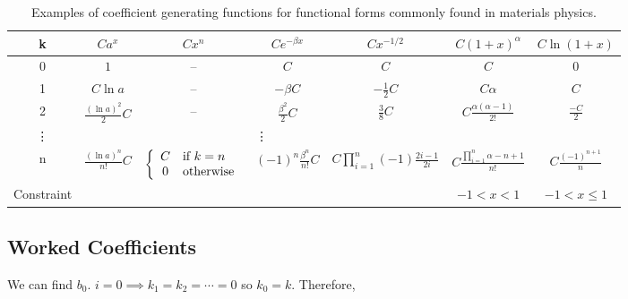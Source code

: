 \begin{sidewaystable}[htp]
\caption{Examples of coefficient generating functions for functional forms commonly found in materials physics.}
\begin{center}
\begin{tabular}{c | c c c c c c}
	k	& %
		$C a^x$	& %
			$C x^n$	& %
				$Ce^{-\beta x}$	& %
					$C x^{-1/2}$ & %
                        $C (1 + x)^\alpha$ & %
                            $C \ln(1 + x)$ \\[2ex]
	\hline
	0	& %
		$1$	& %
			--	& %
				$C$	& %
					$C$ & %
                        $C$ & %
                            $0$ \\[2ex]
	1	& %
		$C \ln a$	& %
			--	& %
				$-\beta C$		& %
					$-\frac{1}{2}C$ & %
                        $C\alpha$ & %
                            $C$ \\[2ex]
	2	& %
		$\frac{(\ln a)^2}{2} C$	& %
			--	&  %
				$\frac{\beta^2}{2} C$	& %
					$\frac{3}{8}C$	& %
                        $C\frac{\alpha (\alpha - 1)}{2!}$ & %
                            $\frac{-C}{2}$ \\[2ex]
	\vdots & \multicolumn{4}{c}{\vdots} \\[2ex]
	n	& %
		$\frac{(\ln a)^n}{n!} C$	& %
			$\left\{\begin{array}{c l}
				C & \text{if}\ k = n \\
				0 & \text{otherwise}
			  \end{array}\right.$	& %
				$(-1)^n\frac{\beta^n}{n!} C$	& %
					$C \prod_{i=1}^n (-1)\frac{2i - 1}{2i}$ & %
                        $C \frac{\prod_{i=1}^n \alpha - n + 1}{n!}$ & %
                            $C\frac{(-1)^{n+1}}{n}$ \\[2ex]
	\hline
    Constraint & %
        & %
            & %
                & %
                    & %
                        $-1 < x < 1$ & %
                            $-1 < x \le 1$ \\
    \hline
\end{tabular}
\end{center}
\label{tab:generating functions of common functions}
\end{sidewaystable}

\subsection{Worked Coefficients}

We can find $b_0$. $i = 0 \implies k_1 = k_2 = \cdots = 0$ so $k_0 = k$. Therefore,


